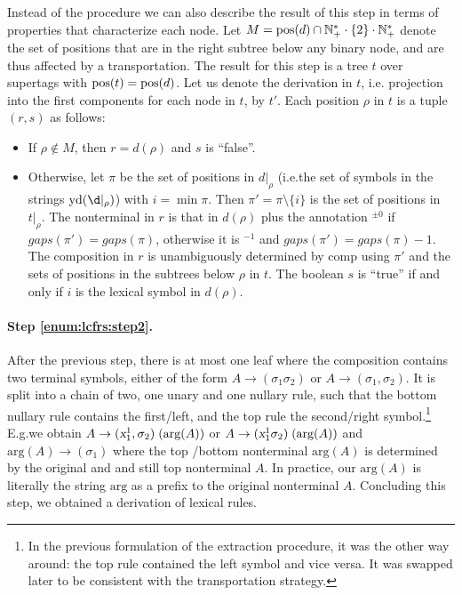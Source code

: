 \documentclass[../../document.tex]{subfiles}
\begin{document}
    Instead of the procedure we can also describe the result of this step in terms of properties that characterize each node.
    Let \(M = \operatorname{pos}(d) \cap \mathbb{N}_+^* \cdot \{2\} \cdot \mathbb{N}_+^*\) denote the set of positions that are in the right subtree below any binary node, and are thus affected by a transportation.
    The result for this step is a tree \(t\) over  supertags with \(\operatorname{pos}(t) = \operatorname{pos}(d)\).
    Let us denote the  derivation in \(t\), i.e. projection into the first components for each node in \(t\), by \(t'\).
    Each position \(\rho\) in \(t\) is a tuple \((r, s)\) as follows:
    \begin{itemize}
        \item If \(\rho \notin M\), then \(r = d(\rho)\) and \(s\) is ``false''.
        \item
            Otherwise, let \(\pi\) be the set of positions in \(d|_\rho\) (i.e.\@ the set of symbols in the strings \(\yield(\d|_\rho)\)) with \(i = \min \pi\).
            Then \(\pi' = \pi \setminus \{i\}\) is the set of positions in \(t|_\rho\).
            The  nonterminal in \(r\) is that in \(d(\rho)\) plus the annotation \(^{\pm 0}\) if \(gaps(\pi') = gaps(\pi)\), otherwise it is \(^{-1}\) and \(gaps(\pi') = gaps(\pi)-1\).
            The composition in \(r\) is unambiguously determined by \(\mathrm{comp}\) using \(\pi'\) and the sets of positions in the subtrees below \(\rho\) in \(t\).
            The boolean \(s\) is ``true'' if and only if \(i\) is the lexical symbol in \(d(\rho)\).
    \end{itemize}


    \paragraph{Step \ref{enum:lcfrs:step2}.}
    After the previous step, there is at most one leaf where the  composition contains two terminal symbols, either of the form \(A \to (\sigma_1 \sigma_2)\) or \(A \to (\sigma_1, \sigma_2)\).
    It is split into a chain of two, one unary and one nullary rule, such that the bottom nullary rule contains the first/left, and the top rule the second/right symbol.\footnote{
        In the previous formulation of the extraction procedure, it was the other way around: the top rule contained the left symbol and vice versa.
        It was swapped later to be consistent with the transportation strategy.
    }
    E.g.\@ we obtain \(A \to (\textsl{x}_1^1, \sigma_2)\;(\text{arg}(A))\) or \(A \to (\textsl{x}_1^1 \sigma_2)\;(\text{arg}(A))\) and \(\text{arg}(A) \to (\sigma_1)\) where the top /bottom  nonterminal \(\text{arg}(A)\) is determined by the original and and still top  nonterminal \(A\).
    In practice, our \(\text{arg}(A)\) is literally the string \(\text{arg}\) as a prefix to the original nonterminal \(A\).
    Concluding this step, we obtained a derivation of lexical rules.
\end{document}
